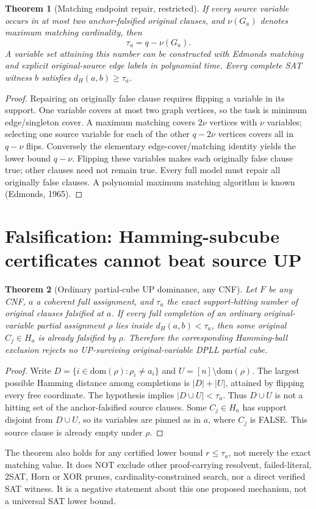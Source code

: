 \documentclass[10pt]{article}
\newtheorem{theorem}{Theorem}
\begin{document}
\begin{theorem}[Matching endpoint repair, restricted]\label{thm:matching}
If every source variable occurs in at most two anchor-falsified original clauses, and $\nu(G_a)$ denotes maximum matching cardinality, then
\[
\boxed{\tau_a=q-\nu(G_a).}
\]
A variable set attaining this number can be constructed with Edmonds matching and explicit original-source edge labels in polynomial time. Every complete SAT witness $b$ satisfies $d_H(a,b)\ge\tau_a$.
\end{theorem}
\begin{proof}
Repairing an originally false clause requires flipping a variable in its support. One variable covers at most two graph vertices, so the task is minimum edge/singleton cover. A maximum matching covers $2\nu$ vertices with $\nu$ variables; selecting one source variable for each of the other $q-2\nu$ vertices covers all in $q-\nu$ flips. Conversely the elementary edge-cover/matching identity yields the lower bound $q-\nu$. Flipping these variables makes each originally false clause true; other clauses need not remain true. Every full model must repair all originally false clauses. A polynomial maximum matching algorithm is known (Edmonds, 1965).
\end{proof}

\section{Falsification: Hamming-subcube certificates cannot beat source UP}
\begin{theorem}[Ordinary partial-cube UP dominance, any CNF]\label{thm:UP}
Let $F$ be any CNF, $a$ a coherent full assignment, and $\tau_a$ the exact support-hitting number of original clauses falsified at $a$. If every full completion of an ordinary original-variable partial assignment $\rho$ lies inside $d_H(a,b)<\tau_a$, then some original $C_j\in H_a$ is already falsified by $\rho$. Therefore the corresponding Hamming-ball exclusion rejects no UP-surviving original-variable DPLL partial cube.
\end{theorem}
\begin{proof}
Write $D=\{i\in\mathrm{dom}(\rho):\rho_i\ne a_i\}$ and $U=[n]\setminus\mathrm{dom}(\rho)$. The largest possible Hamming distance among completions is $|D|+|U|$, attained by flipping every free coordinate. The hypothesis implies $|D\cup U|<\tau_a$. Thus $D\cup U$ is not a hitting set of the anchor-falsified source clauses. Some $C_j\in H_a$ has support disjoint from $D\cup U$, so its variables are pinned as in $a$, where $C_j$ is FALSE. This source clause is already empty under $\rho$. \end{proof}
\noindent The theorem also holds for any certified lower bound $r\le\tau_a$, not merely the exact matching value. It does NOT exclude other proof-carrying resolvent, failed-literal, 2SAT, Horn or XOR prunes, cardinality-constrained search, nor a direct verified SAT witness. It is a negative statement about this one proposed mechanism, not a universal SAT lower bound.
\end{document}

